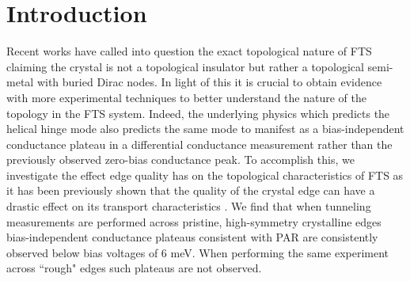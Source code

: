 \section{Introduction}
Recent works have called into question the exact topological nature of \ac{FTS} claiming the crystal is not a topological insulator but rather a topological semi-metal with buried Dirac nodes\cite{Borisenko2020}. In light of this it is crucial to obtain evidence with more experimental techniques to better understand the nature of the topology in the \ac{FTS} system. Indeed, the underlying physics which predicts the helical hinge mode also predicts the same mode to manifest as a bias-independent conductance plateau in a differential conductance measurement rather than the previously observed zero-bias conductance peak\cite{DasSarma2018, Gray2019}. To accomplish this, we investigate the effect edge quality has on the topological characteristics of \ac{FTS} as it has been previously shown that the quality of the crystal edge can have a drastic effect on its transport characteristics \cite{Young2014}. We find that when tunneling measurements are performed across pristine, high-symmetry crystalline edges bias-independent conductance plateaus consistent with \acl{PAR} are consistently observed below bias voltages of 6 meV. When performing the same experiment across ``rough" edges such plateaus are not observed.

